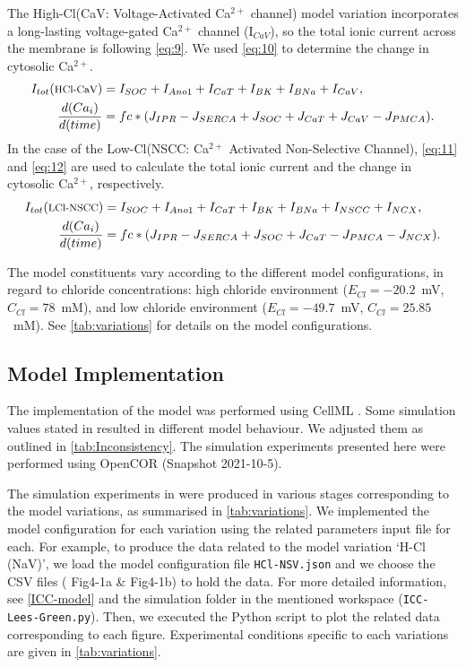 \documentclass[fleqn,10pt]{physiome}
\begin{document}
The High-Cl(CaV: Voltage-Activated Ca$^{2+}$ channel) model variation incorporates a long-lasting voltage-gated Ca$^{2+}$ channel (I$_{CaV}$), so the total ionic current across the membrane is following \autoref{eq:9}. We used \autoref{eq:10} to determine the change in cytosolic Ca$^{2+}$.
\begin{align}
I_{tot}(\text{\footnotesize{HCl-CaV}}) &= I_{SOC}+I_{Ano1}+I_{CaT}+I_{BK}+I_{BNa}+I_{CaV}, \label{eq:9} \\
\frac {d(Ca_{i})}{d(time)}&= fc*(J_{IPR}-J_{SERCA}+J_{SOC}+J_{CaT}+J_{CaV}-J_{PMCA}).\label{eq:10}    
\end{align}
In the case of the Low-Cl(NSCC: Ca$^{2+}$ Activated Non-Selective Channel), \autoref{eq:11} and \autoref{eq:12} are used to calculate the total ionic current and the change in cytosolic Ca$^{2+}$, respectively.
\begin{align}
I_{tot}(\text{\footnotesize{LCl-NSCC}}) &= I_{SOC}+I_{Ano1}+I_{CaT}+I_{BK}+I_{BNa}+I_{NSCC}+I_{NCX},\label{eq:11} \\
\frac {d(Ca_{i})}{d(time)} &= fc*(J_{IPR}-J_{SERCA}+J_{SOC}+J_{CaT}-J_{PMCA}-J_{NCX}). \label{eq:12}    
\end{align}

The model constituents vary according to the different model configurations, in regard to chloride concentrations: high chloride environment ($E_{Cl} = - 20.2$~mV, $C_{Cl} = 78$~mM), and low chloride environment ($E_{Cl} = - 49.7$~mV, $C_{Cl} = 25.85$~mM). See \autoref{tab:variations} for details on the model configurations.


\subsection{Model Implementation}
The implementation of the model was performed using CellML \citep{doi:10.1177/0037549703040939}. Some simulation values stated in \citet{lees2014computational} resulted in different model behaviour. We adjusted them as outlined in \autoref{tab:Inconsistency}. The simulation experiments presented here were performed using OpenCOR (Snapshot 2021-10-5).

The simulation experiments in \citet[Figures 4 \& 5 ]{lees2014computational} were produced in various stages corresponding to the model variations, as summarised in \autoref{tab:variations}. We implemented the model configuration for each variation using the related parameters input file for each. For example, to produce the data related to the model variation `H-Cl (NaV)', we load the model configuration file \texttt{HCl-NSV.json} and we choose the CSV files ( Fig4-1a \& Fig4-1b) to hold the data. For more detailed information, see \autoref{ICC-model} and the simulation folder in the mentioned workspace (\texttt{ICC-Lees-Green.py}). Then, we executed the Python script to plot the related data corresponding to each figure.
Experimental conditions specific to each variations are given in \autoref{tab:variations}. 
\end{document}
